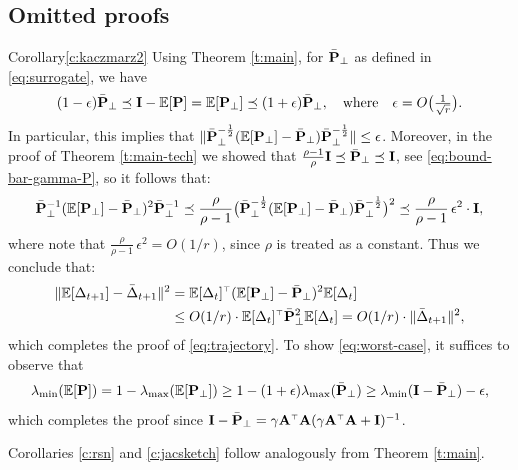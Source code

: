 \documentclass{article}
\begin{document}
\subsection{Omitted proofs}
\begin{proofof}{Corollary}{\ref{c:kaczmarz2}}
Using Theorem \ref{t:main}, for $\bar\P_{\perp}$ as defined in \eqref{eq:surrogate}, we have
  \begin{align*}
    (1-\epsilon)\bar\P_{\perp}\preceq \I-\E[\P] =
    \E[\P_{\perp}]\preceq(1+\epsilon)\bar\P_{\perp},
    \quad\text{where}\quad\epsilon=O\big(\tfrac 1{\sqrt r}\big).
  \end{align*}
In particular, this implies that
$\|\bar\P_{\perp}^{-\frac12}(\E[\P_{\perp}]-\bar\P_{\perp})\bar\P_{\perp}^{-\frac12}\|\leq\epsilon$.
Moreover, in the proof of Theorem \ref{t:main-tech} we showed that
  $\frac{\rho-1}\rho\I\preceq\bar\P_{\perp}\preceq\I$, see
  \eqref{eq:bound-bar-gamma-P}, so it follows that:
  \begin{align*}
    \bar\P_{\perp}^{-1}(\E[\P_{\perp}]-\bar\P_{\perp})^2\bar\P_{\perp}^{-1}\preceq
    \frac{\rho}{\rho-1}\big(\bar\P_{\perp}^{-\frac12}(\E[\P_{\perp}]-\bar\P_{\perp})\bar\P_{\perp}^{-\frac12}\big)^2
    \preceq     \frac{\rho}{\rho-1}\,\epsilon^2\cdot \I,
  \end{align*}
  where note that  $\frac{\rho}{\rho-1}\,\epsilon^2=O(1/r)$, since
  $\rho$ is treated as a constant. Thus we conclude that:
  \begin{align*}
    \|\E[\Delta_{t+1}]-\bar\Delta_{t+1}\|^2
    &=\E[\Delta_t]^\top(\E[\P_{\perp}]-\bar\P_{\perp})^2\E[\Delta_t]
    \\
    &\leq O(1/r)\cdot \E[\Delta_t]^\top\bar\P_{\perp}^2\E[\Delta_t] =
      O(1/r)\cdot \|\bar\Delta_{t+1}\|^2,
  \end{align*}
  which completes the proof of \eqref{eq:trajectory}. To show
  \eqref{eq:worst-case}, it suffices to observe that
  \begin{align*}
    \lambda_{\min}(\E[\P])
    = 1- \lambda_{\max}(\E[\P_{\perp}])
    \geq 1-(1+\epsilon)\lambda_{\max}(\bar\P_{\perp})
    \geq \lambda_{\min}(\I-\bar\P_{\perp}) - \epsilon,
  \end{align*}
  which completes the proof since
  $\I-\bar\P_{\perp}=\gamma\A^\top\A(\gamma\A^\top\A+\I)^{-1}$. 
\end{proofof}

Corollaries \ref{c:rsn} and \ref{c:jacsketch} follow analogously from
Theorem \ref{t:main}.
\end{document}
